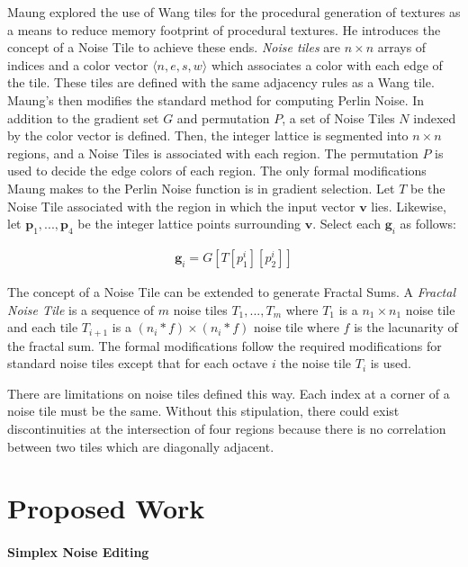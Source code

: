 \documentclass[12pt]{article}
\theoremstyle{definition}
\theoremstyle{remark}
\begin{document}
Maung\cite{maung2016} explored the use of Wang tiles for the procedural generation of textures as a means to reduce memory footprint of procedural textures. He introduces the concept of a Noise Tile to achieve these ends. \textit{Noise tiles} are $n \times n$ arrays of indices and a color vector $\langle n, e, s, w \rangle$ which associates a color with each edge of the tile. These tiles are defined with the same adjacency rules as a Wang tile. Maung's then modifies the standard method for computing Perlin Noise. In addition to the gradient set $G$ and permutation $P$, a set of Noise Tiles $N$ indexed by the color vector is defined. Then, the integer lattice is segmented into $n \times n$ regions, and a Noise Tiles is associated with each region. The permutation $P$ is used to decide the edge colors of each region. The only formal modifications Maung makes to the Perlin Noise function is in gradient selection. Let $T$ be the Noise Tile associated with the region in which the input vector $\textbf{v}$ lies. Likewise, let $\textbf{p}_1, ..., \textbf{p}_4$ be the integer lattice points surrounding $\textbf{v}$. Select each $\textbf{g}_i$ as follows:

\begin{align*}
	\textbf{g}_i = G[T[p^i_1][p^i_2]]
\end{align*}

The concept of a Noise Tile can be extended to generate Fractal Sums. A \textit{Fractal Noise Tile} is a sequence of $m$ noise tiles $T_1, ..., T_m$ where $T_1$ is a $n_1 \times n_1$ noise tile and each tile $T_{i+1}$ is a $(n_i * f) \times (n_i * f)$ noise tile where $f$ is the lacunarity of the fractal sum. The formal modifications follow the required modifications for standard noise tiles except that for each octave $i$ the noise tile $T_i$ is used.

There are limitations on noise tiles defined this way. Each index at a corner of a noise tile must be the same. Without this stipulation, there could exist discontinuities at the intersection of four regions because there is no correlation between two tiles which are diagonally adjacent.

\singlespacing
\section{Proposed Work}
\doublespacing

\paragraph{Simplex Noise Editing}
\end{document}
